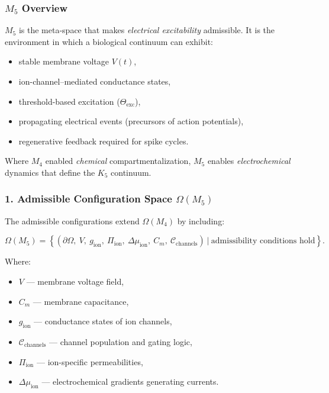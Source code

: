 

\subsubsection{\texorpdfstring{$M_5$}{M_5} Overview}
\label{sec:m5-overview}

$M_5$ is the meta-space that makes \emph{electrical excitability} admissible.
It is the environment in which a biological continuum can exhibit:

\begin{itemize}
    \item stable membrane voltage $V(t)$,
    \item ion-channel–mediated conductance states,
    \item threshold-based excitation ($\Theta_{\mathrm{exc}}$),
    \item propagating electrical events (precursors of action potentials),
    \item regenerative feedback required for spike cycles.
\end{itemize}

Where $M_4$ enabled \emph{chemical} compartmentalization,
$M_5$ enables \emph{electrochemical} dynamics that define the $K_5$ continuum.

\subsubsection*{1. Admissible Configuration Space \texorpdfstring{$\Omega(M_5)$}{\Omega(M_5)}}

The admissible configurations extend $\Omega(M_4)$ by including:

\[
\Omega(M_5) =
\left\{
(\partial\Omega,\ V,\ g_{\mathrm{ion}},\
\Pi_{\mathrm{ion}},\
\Delta\mu_{\mathrm{ion}},\
C_m,\
\mathcal{C}_{\mathrm{channels}})
\ \Big|\
\text{admissibility conditions hold}
\right\}.
\]

Where:

\begin{itemize}
    \item $V$ — membrane voltage field,
    \item $C_m$ — membrane capacitance,
    \item $g_{\mathrm{ion}}$ — conductance states of ion channels,
    \item $\mathcal{C}_{\mathrm{channels}}$ — channel population and gating logic,
    \item $\Pi_{\mathrm{ion}}$ — ion-specific permeabilities,
    \item $\Delta\mu_{\mathrm{ion}}$ — electrochemical gradients generating currents.
\end{itemize}

